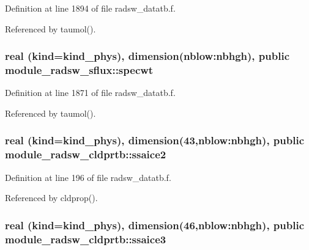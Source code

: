 Definition at line 1894 of file radsw\+\_\+datatb.\+f.



Referenced by taumol().

\subsubsection[{\texorpdfstring{specwt}{specwt}}]{\setlength{\rightskip}{0pt plus 5cm}real (kind=kind\+\_\+phys), dimension(nblow\+:nbhgh), public module\+\_\+radsw\+\_\+sflux\+::specwt}\hypertarget{group__module__radsw__main_ga7d1a386e92555bcb09239ab098d8b398}{}\label{group__module__radsw__main_ga7d1a386e92555bcb09239ab098d8b398}


Definition at line 1871 of file radsw\+\_\+datatb.\+f.



Referenced by taumol().

\subsubsection[{\texorpdfstring{ssaice2}{ssaice2}}]{\setlength{\rightskip}{0pt plus 5cm}real (kind=kind\+\_\+phys), dimension(43,nblow\+:nbhgh), public module\+\_\+radsw\+\_\+cldprtb\+::ssaice2}\hypertarget{group__module__radsw__main_ga48555ff54d3a46f8c49733ff82e94d70}{}\label{group__module__radsw__main_ga48555ff54d3a46f8c49733ff82e94d70}


Definition at line 196 of file radsw\+\_\+datatb.\+f.



Referenced by cldprop().

\subsubsection[{\texorpdfstring{ssaice3}{ssaice3}}]{\setlength{\rightskip}{0pt plus 5cm}real (kind=kind\+\_\+phys), dimension(46,nblow\+:nbhgh), public module\+\_\+radsw\+\_\+cldprtb\+::ssaice3}\hypertarget{group__module__radsw__main_ga39b045b05e6bc9c04603277654ff8fc6}{}\label{group__module__radsw__main_ga39b045b05e6bc9c04603277654ff8fc6}


